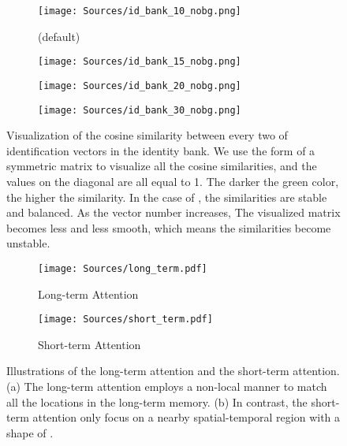 \documentclass{article}
\begin{document}
\begin{figure}[t!]
\begin{center}

\begin{subfigure}[t]{.24\textwidth}
			\centering
			\texttt{[image: Sources/id\_bank\_10\_nobg.png]}
			\caption{ (default)}\label{fig:id_bank_10}
\end{subfigure}
\begin{subfigure}[t]{.24\textwidth}
			\centering
			\texttt{[image: Sources/id\_bank\_15\_nobg.png]}
			\caption{}\label{fig:id_bank_15}
\end{subfigure}
\begin{subfigure}[t]{.24\textwidth}
			\centering
			\texttt{[image: Sources/id\_bank\_20\_nobg.png]}
			\caption{}\label{fig:id_bank_20}
\end{subfigure}
\begin{subfigure}[t]{.24\textwidth}
			\centering
			\texttt{[image: Sources/id\_bank\_30\_nobg.png]}
			\caption{}\label{fig:id_bank_30}
\end{subfigure}

\end{center}

\caption{Visualization of the cosine similarity between every two of  identification vectors in the identity bank. We use the form of a  symmetric matrix to visualize all the cosine similarities, and the values on the diagonal are all equal to 1. The darker the green color, the higher the similarity. In the case of , the similarities are stable and balanced. As the vector number  increases, The visualized matrix becomes less and less smooth, which means the similarities become unstable.}\label{fig:id_bank}
\end{figure} \begin{figure}[t!]
\begin{center}

\begin{subfigure}[b]{.45\textwidth}
			\centering
			\texttt{[image: Sources/long\_term.pdf]}
			\caption{Long-term Attention}\label{fig:long_term}
\end{subfigure}
\begin{subfigure}[b]{.45\textwidth}
			\centering
			\texttt{[image: Sources/short\_term.pdf]}

			\caption{Short-term Attention}\label{fig:short_term}
\end{subfigure}


\end{center}

\caption{Illustrations of the long-term attention and the short-term attention. (a) The long-term attention employs a non-local manner to match all the locations in the long-term memory. (b) In contrast, the short-term attention only focus on a nearby spatial-temporal region with a shape of .}\label{fig:long_short_term}
\end{figure} 
\end{document}
